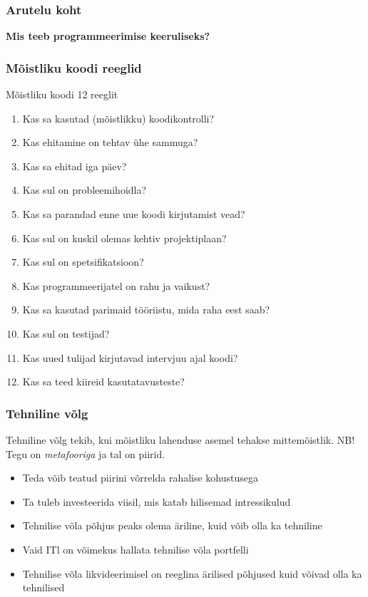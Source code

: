 \begin{frame}[fragile]
  \frametitle{Arutelu koht}
		\begin{center}
			\textbf{Mis teeb programmeerimise keeruliseks?}
		\end{center}
\end{frame}


\begin{frame}[fragile]
  \frametitle{Mõistliku koodi reeglid}
  Mõistliku koodi 12 reeglit \cite{spolsky2004joel}
\small  
	\begin{enumerate}
		\item Kas sa kasutad (mõistlikku) koodikontrolli?
		\item Kas ehitamine on tehtav ühe sammuga?
		\item Kas sa ehitad iga päev?
		\item Kas sul on probleemihoidla?
		\item Kas sa parandad enne uue koodi kirjutamist vead?
		\item Kas sul on kuskil olemas kehtiv projektiplaan?
		\item Kas sul on spetsifikatsioon?
		\item Kas programmeerijatel on rahu ja vaikust?
		\item Kas sa kasutad parimaid tööriistu, mida raha eest saab?
		\item Kas sul on testijad?
		\item Kas uued tulijad kirjutavad intervjuu ajal koodi?
		\item Kas sa teed kiireid kasutatavusteste?
	\end{enumerate}
\normalsize
\end{frame}


\begin{frame}[fragile]
  \frametitle{Tehniline võlg}
	Tehniline võlg tekib, kui mõistliku lahenduse asemel tehakse mittemõistlik. NB! Tegu on \emph{metafooriga} ja tal on piirid.
  \begin{itemize}
	\item Teda võib teatud piirini võrrelda rahalise kohustusega
	\item Ta tuleb investeerida viisil, mis katab hilisemad intressikulud
	\item Tehnilise võla põhjus peaks olema äriline, kuid võib olla ka tehniline 
	\item Vaid ITl on võimekus hallata tehnilise võla portfelli
	\item Tehnilise võla likvideerimisel on reeglina ärilised põhjused kuid võivad olla ka tehnilised
  \end{itemize}

\end{frame}

